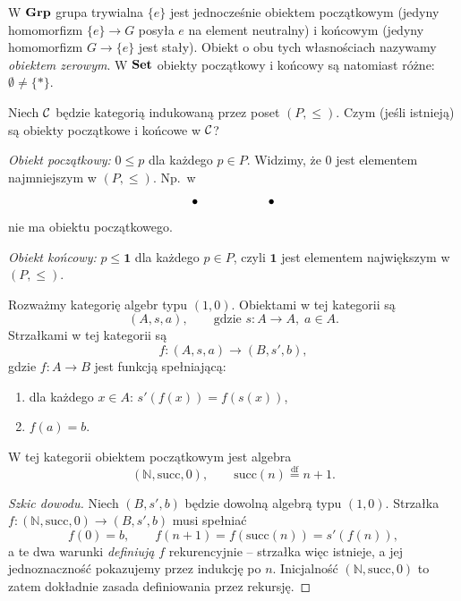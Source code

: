 \begin{przyklad}
W $\mathbf{Grp}$ grupa trywialna $\{e\}$ jest jednocześnie obiektem początkowym (jedyny homomorfizm $\{e\} \to G$ posyła $e$ na element neutralny) i końcowym (jedyny homomorfizm $G \to \{e\}$ jest stały). Obiekt o obu tych własnościach nazywamy \emph{obiektem zerowym}. W $\mathbf{Set}$ obiekty początkowy i końcowy są natomiast różne: $\emptyset \neq \{*\}$.
\end{przyklad}

\begin{przyklad}
Niech $\mathcal{C}$ będzie kategorią indukowaną przez poset $(P,\leq)$. Czym (jeśli istnieją) są obiekty początkowe i końcowe w $\mathcal{C}$?

\emph{Obiekt początkowy:} $0\leq p$ dla każdego $p\in P$. Widzimy, że $0$ jest elementem najmniejszym w $(P,\leq)$. Np.\ w
\[
\begin{tikzcd}
\bullet & & \bullet
\end{tikzcd}
\]
nie ma obiektu początkowego.

\emph{Obiekt końcowy:} $p \leq \mathbf{1}$ dla każdego $p\in P$, czyli $\mathbf{1}$ jest elementem największym w $(P,\leq)$.
\end{przyklad}

\begin{przyklad}
Rozważmy kategorię algebr typu $(1,0)$. Obiektami w tej kategorii są
\[
(A,s,a), \qquad \text{gdzie } s\colon A\to A,\; a\in A.
\]
Strzałkami w tej kategorii są
\[
f\colon (A,s,a) \longrightarrow (B,s',b),
\]
gdzie $f\colon A\to B$ jest funkcją spełniającą:
\begin{enumerate}
\item dla każdego $x\in A$: $s'(f(x)) = f(s(x))$,
\item $f(a)=b$.
\end{enumerate}
\end{przyklad}

\begin{stwierdzenie}
W tej kategorii obiektem początkowym jest algebra
\[
(\mathbb{N},\mathrm{succ},0), \qquad \mathrm{succ}(n)\stackrel{\mathrm{df}}{=} n+1.
\]
\end{stwierdzenie}

\begin{proof}[Szkic dowodu]
Niech $(B, s', b)$ będzie dowolną algebrą typu $(1,0)$. Strzałka $f\colon (\mathbb{N},\mathrm{succ},0)\to (B,s',b)$ musi spełniać
\[
f(0) = b, \qquad f(n+1) = f(\mathrm{succ}(n)) = s'(f(n)),
\]
a te dwa warunki \emph{definiują} $f$ rekurencyjnie -- strzałka więc istnieje, a jej jednoznaczność pokazujemy przez indukcję po $n$. Inicjalność $(\mathbb{N},\mathrm{succ},0)$ to zatem dokładnie zasada definiowania przez rekursję.
\end{proof}

